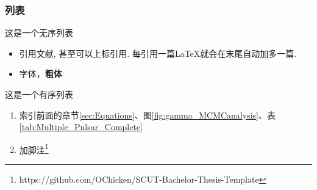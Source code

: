 \subsubsection{列表}
\label{sec:font_list_etc:list}
这是一个无序列表
\begin{itemize}
\item 引用文献\cite{long2015fully}, 甚至可以上标引用. 每引用一篇\LaTeX 就会在末尾自动加多一篇.
\item 字体{\color{red}{变红}}，\textbf{粗体}
\end{itemize}

这是一个有序列表
\begin{enumerate}
\item 索引前面的章节\ref{sec:Equations}、图\ref{fig:gamma_MCMCanalysis}、表\ref{tab:Multiple_Pulsar_Complete}
\item 加脚注\footnote{https://github.com/OChicken/SCUT-Bachelor-Thesis-Template}
\end{enumerate}

\pagebreak[4]
